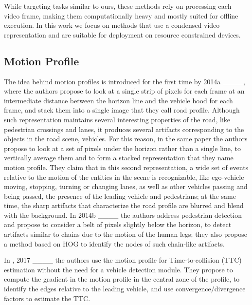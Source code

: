 While targeting tasks similar to ours, these methods rely on processing each video frame, making them computationally heavy and mostly suited for offline execution. In this work we focus on methods that use a condensed video representation and are suitable for deployment on resource constrained devices.

\subsection{Motion Profile}

The idea behind motion profiles is introduced for the first time by \kilicarslan \etal 2014a ____,
where the authors propose to look at a single strip of pixels for each frame at an intermediate distance between the horizon line and the vehicle hood for each frame, 
and stack them into a single image that they call road profile.
Although such representation maintains several interesting properties of the road, like pedestrian crossings and lanes, it produces several artifacts corresponding to the objects in the road scene, \eg vehicles.
For this reason, in the same paper the authors propose to look at a set of pixels under the horizon rather than a single line, to vertically average them and to form a stacked representation that they name motion profile.
They claim that in this second representation, a wide set of events relative to the motion of the entities in the scene is recognizable, 
like ego-vehicle moving, stopping, turning or changing lanes, 
as well as other vehicles passing and being passed, the presence of the leading vehicle and pedestrians; at the same time, the sharp artifacts that characterize the road profile are blurred and blend with the background.
In \kilicarslan \etal 2014b ____ the authors address pedestrian detection and propose to consider a belt of pixels slightly below the horizon, to detect artifacts similar to chains due to the motion of the human legs; they also propose a method based on HOG to identify the nodes of such chain-like artifacts.

In \kilicarslan {}, 2017 ____ the authors use the motion profile for Time-to-collision (TTC) estimation without the need for a vehicle detection module. They propose to compute the gradient in the motion profile in the central zone of the profile, to identify the edges relative to the leading vehicle, and use convergence/divergence factors to estimate the TTC.

